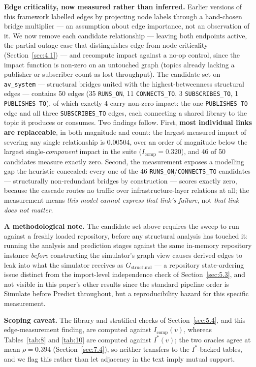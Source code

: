 \textbf{Edge criticality, now measured rather than inferred.} Earlier versions of this framework
labelled edges by projecting node labels through a hand-chosen bridge multiplier --- an assumption
about edge importance, not an observation of it. We now remove each candidate relationship ---
leaving both endpoints active, the partial-outage case that distinguishes edge from node criticality
(Section~\ref{sec:4.1}) --- and recompute impact against a no-op control, since the impact function
is non-zero on an untouched graph (topics already lacking a publisher or subscriber count as lost
throughput). The candidate set on \texttt{av\_system} --- structural bridges united with the
highest-betweenness structural edges --- contains 50 edges (35 \texttt{RUNS\_ON}, 11
\texttt{CONNECTS\_TO}, 3 \texttt{SUBSCRIBES\_TO}, 1 \texttt{PUBLISHES\_TO}), of which exactly 4 carry
non-zero impact: the one \texttt{PUBLISHES\_TO} edge and all three \texttt{SUBSCRIBES\_TO} edges,
each connecting a shared library to the topic it produces or consumes. Two findings follow. First,
\textbf{most individual links are replaceable}, in both magnitude and count: the largest measured
impact of severing any single relationship is \(0.00504\), over an order of magnitude below the
largest single-\emph{component} impact in the suite (\(I_{\text{comp}}=0.320\)), and 46 of 50
candidates measure exactly zero. Second, the measurement exposes a modelling gap the heuristic
concealed: every one of the 46 \texttt{RUNS\_ON}/\texttt{CONNECTS\_TO} candidates --- structurally
non-redundant bridges by construction --- scores exactly zero, because the cascade routes no traffic
over infrastructure-layer relations at all; the measurement means \emph{this model cannot express
that link's failure}, not \emph{that link does not matter}.

\textbf{A methodological note.} The candidate set above requires the sweep to run against a freshly
loaded repository, before any structural analysis has touched it: running the analysis and prediction
stages against the same in-memory repository instance \emph{before} constructing the simulator's
graph view causes derived edges to leak into what the simulator receives as \(G_{\text{structural}}\)
--- a repository state-ordering issue distinct from the import-level independence check of
Section~\ref{sec:5.3}, and not visible in this paper's other results since the standard pipeline
order is Simulate before Predict throughout, but a reproducibility hazard for this specific
measurement.

\textbf{Scoping caveat.} The library and stratified checks of Section~\ref{sec:5.4}, and this
edge-measurement finding, are computed against \(I_{\text{comp}}(v)\), whereas Tables~\ref{tab:8} and
\ref{tab:10} are computed against \(I^*(v)\); the two oracles agree at mean \(\rho=0.394\)
(Section~\ref{sec:7.4}), so neither transfers to the \(I^*\)-backed tables, and we flag this rather
than let adjacency in the text imply mutual support.

